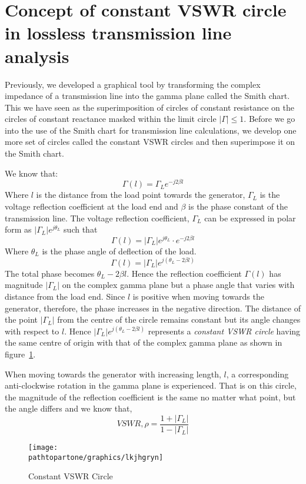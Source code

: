 \section{Concept of constant VSWR circle in lossless transmission line analysis}\label{lec:lec8}
Previously, we developed a graphical tool by transforming the complex impedance of a transmission line into the gamma plane called the Smith chart. This we have seen as the superimposition of circles of constant resistance on the circles of constant reactance masked within the limit circle $|\Gamma| \leq 1$. Before we go into the use of the Smith chart for transmission line calculations, we develop one more set of circles called the constant VSWR circles and then superimpose it on the Smith chart.

We know that:
\begin{equation*}
\Gamma(l) =\Gamma_L e^{-j2\beta{l}}
\end{equation*}
Where $l$ is the distance from the load point towards the generator, $\Gamma_{L}$ is the voltage reflection coefficient at the load end and $\beta$ is the phase constant of the transmission line. The voltage reflection coefficient, $\Gamma_L$ can be expressed in polar form as $|\Gamma_{L}|e^{j\theta_L}$ such that
\begin{equation*}
\Gamma{(l)} = |\Gamma_{L}|e^{j\theta_L}\cdot e^{-j2\beta l}
\end{equation*}
Where $\theta_L$ is the phase angle of deflection of the load.
\begin{equation}
\Gamma{(l)} =|\Gamma_L|e^{j(\theta_L - 2\beta{l})}
\end{equation}
The total phase becomes $\theta_L - 2\beta{l}$. Hence the reflection coefficient $\Gamma{(l)}$ has magnitude $|\Gamma_L|$ on the complex gamma plane but a phase angle that varies with distance from the load end. Since $l$ is positive when moving towards the generator, therefore, the phase increases in the negative direction. The distance of the point $|\Gamma_L|$ from the centre of the circle remains constant but its angle changes with respect to $l$. Hence $|\Gamma_L|e^{j(\theta_L - 2\beta l)}$ represents a \emph{constant VSWR circle} having the same centre of origin with that of the complex gamma plane as shown in figure~\ref{fig:lkjhgryn}.

When moving towards the generator with increasing length, $l$, a corresponding anti-clockwise rotation in the gamma plane is experienced. That is on this circle, the magnitude of the reflection coefficient is the same no matter what point, but the angle differs and we know that,
\begin{equation}
VSWR, \rho = \frac{1 + |\Gamma_L|}{1 - |\Gamma_L|}
\end{equation}
\begin{figure}[h]
\centering
\texttt{[image: \\pathtopartone/graphics/lkjhgryn]}
\caption{Constant VSWR Circle}
\label{fig:lkjhgryn}
\end{figure}

